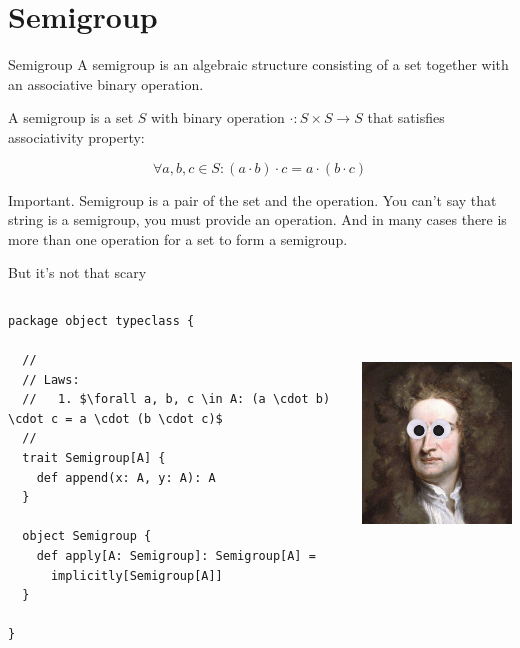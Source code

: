 \documentclass[presentation,aspectratio=169,smaller]{beamer}
\begin{document}
\section*{Semigroup}
\label{sec:org3ac9575}

\begin{frame}[label={sec:orgeb41d09}]{Semigroup}
A semigroup is an algebraic structure consisting of a set together with an
associative binary operation.

\pause

A semigroup is a set \(S\) with binary operation \(\cdot : S \times S \rightarrow
S\) that satisfies associativity property:

$$\forall a, b, c \in S : (a \cdot b) \cdot c = a \cdot (b \cdot c)$$

\pause

\alert{Important}. Semigroup is a pair of the set and the operation. You can’t say
 that string is a semigroup, you must provide an operation. And in many cases
 there is more than one operation for a set to form a semigroup.
\end{frame}

\begin{frame}[label={sec:orgda03762},fragile]{But it’s not that scary}
 \begin{columns}
\begin{column}{0.5\columnwidth}
\begin{verbatim}
package object typeclass {

  //
  // Laws:
  //   1. $\forall a, b, c \in A: (a \cdot b) \cdot c = a \cdot (b \cdot c)$
  //
  trait Semigroup[A] {
    def append(x: A, y: A): A
  }

  object Semigroup {
    def apply[A: Semigroup]: Semigroup[A] =
      implicitly[Semigroup[A]]
  }

}
\end{verbatim}
\end{column}

\begin{column}{0.5\columnwidth}
\begin{center}
\includegraphics[height=7cm]{images/scary.png}
\end{center}
\end{column}
\end{columns}
\end{frame}
\end{document}
